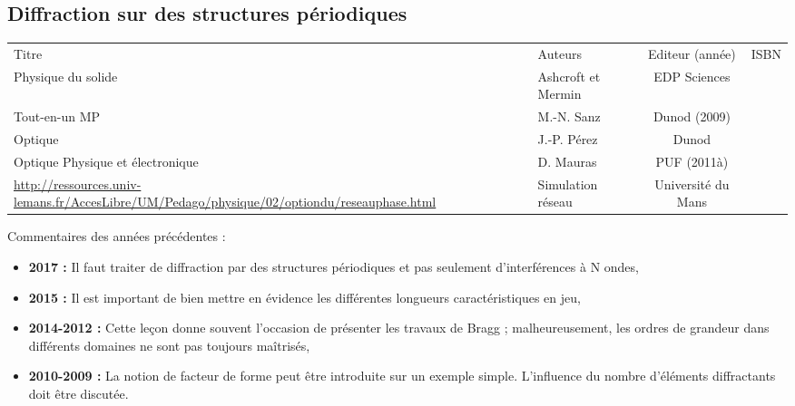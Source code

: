 \begin{headerBlock}
  \chapter{Diffraction sur des structures périodiques}
    \label{LP_DiffractionPeriodique}
\end{headerBlock}

\begin{center}
\begin{tabularx}{\textwidth}{| X | X | c | c |}
  \hline
  \rowcolor{gray!20}\multicolumn{4}{c}{Bibliographie de la leçon : } \\
  \hline 
  Titre & Auteurs & Editeur (année) & ISBN \\
  \hline
   Physique du solide & Ashcroft et Mermin & EDP Sciences &   \\
  \hline 
   Tout-en-un MP & M.-N. Sanz & Dunod (2009) &  \\
  \hline 
  Optique & J.-P. Pérez & Dunod & \\
  \hline 
  Optique Physique et électronique & D. Mauras & PUF (2011à) & \\
  \hline
  \url{http://ressources.univ-lemans.fr/AccesLibre/UM/Pedago/physique/02/optiondu/reseauphase.html} & Simulation réseau & Université du Mans & \\
\end{tabularx}
\end{center}

\begin{reportBlock}{Commentaires des années précédentes :}
    \begin{itemize}
        \item \textbf{2017 :} Il faut traiter de diffraction par des structures périodiques et pas seulement d’interférences à N ondes,
        \item \textbf{2015 :} Il est important de bien mettre en évidence les différentes longueurs caractéristiques en jeu,
        \item \textbf{2014-2012 :} Cette leçon donne souvent l’occasion de présenter les travaux de Bragg ; malheureusement, les ordres de grandeur dans différents domaines ne sont pas toujours maîtrisés,
        \item \textbf{2010-2009 :} La notion de facteur de forme peut être introduite sur un exemple simple. L’influence du nombre d’éléments diffractants doit être discutée.
    \end{itemize}
\end{reportBlock}

